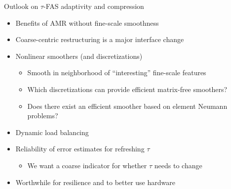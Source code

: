 \documentclass{beamer}
\begin{document}
\begin{frame}{Outlook on $\tau$-FAS adaptivity and compression}
  \begin{itemize}
  \item Benefits of AMR without fine-scale smoothness
  \item Coarse-centric restructuring is a major interface change
  \item Nonlinear smoothers (and discretizations)
    \begin{itemize}
    \item Smooth in neighborhood of ``interesting'' fine-scale features
    \item Which discretizations can provide efficient matrix-free smoothers?
    \item Does there exist an efficient smoother based on element Neumann problems?
    \end{itemize}
  \item Dynamic load balancing
  \item Reliability of error estimates for refreshing $\tau$
    \begin{itemize}
    \item We want a coarse indicator for whether $\tau$ needs to change
    \end{itemize}
  \item Worthwhile for resilience and to better use hardware
  \end{itemize}
\end{frame}
\end{document}

